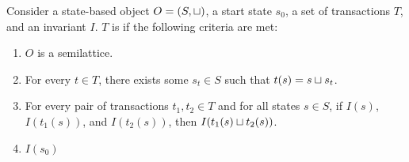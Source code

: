 \begin{claim}
  Consider a state-based object $O = (S, \sqcup)$, a start state $s_0$, a set of
  transactions $T$, and an invariant $I$. $T$ is \sTIconfluent{} if the
  following criteria are met:
  \begin{enumerate}
    \item
      $O$ is a semilattice.

    \item
      For every $t \in T$, there exists some $s_t \in S$ such that $t(s) = s
      \sqcup s_t$.

    \item
      For every pair of transactions $t_1, t_2 \in T$ and for all states $s \in
      S$, if $I(s)$, $I(t_1(s))$, and $I(t_2(s))$, then $I(t_1(s) \sqcup
      t_2(s))$.

    \item
      $I(s_0)$
  \end{enumerate}
\end{claim}

